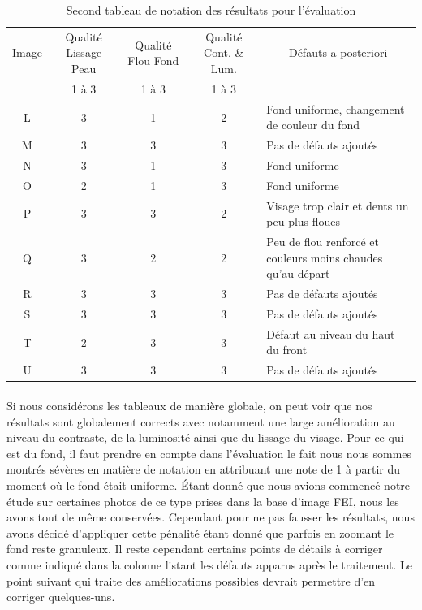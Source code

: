\documentclass[11pt, french]{report-rd-info}
\begin{document}
\begin{table}
\centering
\caption{Second tableau de notation des résultats pour l'évaluation}
\begin{tabular}{|c|c|c|c|p{3cm}|}
\hline
\multicolumn{ 1}{|c|}{Image} & Qualité Lissage Peau & Qualité Flou Fond & Qualité Cont. \& Lum. & \multicolumn{ 1}{c|}{Défauts a posteriori} \\ \cline{ 2- 4}
\multicolumn{ 1}{|c|}{} & 1 à 3 & 1 à 3 & 1 à 3 & \multicolumn{ 1}{c|}{} \\ \hline
L & 3 & 1 & 2 & Fond uniforme, changement de couleur du fond \\ \hline
M & 3 & 3 & 3 & Pas de défauts ajoutés \\ \hline
N & 3 & 1 & 3 & Fond uniforme \\ \hline
O & 2 & 1 & 3 & Fond uniforme \\ \hline
P & 3 & 3 & 2 & Visage trop clair et dents un peu plus floues \\ \hline
Q & 3 & 2 & 2 & Peu de flou renforcé et couleurs moins chaudes qu'au départ \\ \hline
R & 3 & 3 & 3 & Pas de défauts ajoutés \\ \hline
S & 3 & 3 & 3 & Pas de défauts ajoutés \\ \hline
T & 2 & 3 & 3 & Défaut au niveau du haut du front \\ \hline
U & 3 & 3 & 3 & Pas de défauts ajoutés \\ \hline
\end{tabular}
\label{TableauEvaluation2}
\end{table}

\paragraph*{}
Si nous considérons les tableaux de manière globale, on peut voir que nos résultats sont globalement corrects avec notamment une large amélioration au niveau du contraste, de la luminosité ainsi que du lissage du visage. Pour ce qui est du fond, il faut prendre en compte dans l’évaluation le fait nous nous sommes montrés sévères en matière de notation en attribuant une note de 1 à partir du moment où le fond était uniforme. Étant donné que nous avions commencé notre étude sur certaines photos de ce type prises dans la base d’image FEI, nous les avons tout de même conservées. Cependant pour ne pas fausser les résultats, nous avons décidé d’appliquer cette pénalité étant donné que parfois en zoomant le fond reste granuleux.
Il reste cependant certains points de détails à corriger comme indiqué dans la colonne listant les défauts apparus après le traitement. Le point suivant qui traite des améliorations possibles devrait permettre d’en corriger quelques-uns.
\end{document}
